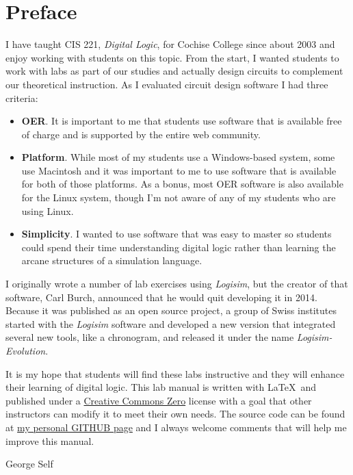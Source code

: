 \chapter*{Preface}\label{preface}

I have taught CIS 221, \textit{Digital Logic}, for Cochise College since about 2003 and enjoy working with students on this topic. From the start, I wanted students to work with labs as part of our studies and actually design circuits to complement our theoretical instruction. As I evaluated circuit design software I had three criteria:

\begin{itemize}
  \item \textbf{\ac{OER}}. It is important to me that students use software that is available free of charge and is supported by the entire web community. 
  \item \textbf{Platform}. While most of my students use a Windows-based system, some use Macintosh and it was important to me to use software that is available for both of those platforms. As a bonus, most OER software is also available for the Linux system, though I'm not aware of any of my students who are using Linux.
  \item \textbf{Simplicity}. I wanted to use software that was easy to master so students could spend their time understanding digital logic rather than learning the arcane structures of a simulation language.
\end{itemize}

I originally wrote a number of lab exercises using \textit{Logisim}, but the creator of that software, Carl Burch, announced that he would quit developing it in 2014. Because it was published as an open source project, a group of Swiss institutes started with the \textit{Logisim} software and developed a new version that integrated several new tools, like a chronogram, and released it under the name \textit{Logisim-Evolution}.

It is my hope that students will find these labs instructive and they will enhance their learning of digital logic. This lab manual is written with \LaTeX\ and published under a \href{https://creativecommons.org/publicdomain/zero/1.0/}{Creative Commons Zero} license with a goal that other instructors can modify it to meet their own needs. The source code can be found at \href{https://github.com/georgeself/CIS221_Labs}{my personal GITHUB page} and I always welcome comments that will help me improve this manual.

\bigskip
\begin{flushright}
  \textemdash  George Self
\end{flushright}


